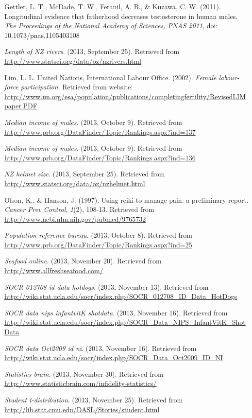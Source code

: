 \documentclass[]{book}
\begin{document}
Gettler, L. T., McDade, T. W., Feranil, A. B., \& Kuzawa, C. W. (2011).
Longitudinal evidence that fatherhood decreases testosterone in human
males. \emph{The Proceedings of the National Academy of Sciences, PNAS 2011},
doi: 10.1073/pnas.1105403108

\emph{Length of NZ rivers}. (2013, September 25). Retrieved from
\url{http://www.statsci.org/data/oz/nzrivers.html}

Lim, L. L. United Nations, International Labour Office. (2002). \emph{Female
labour-force participation}. Retrieved from website:
\url{http://www.un.org/esa/population/publications/completingfertility/RevisedLIMpaper.PDF}

\emph{Median income of males}. (2013, October 9). Retrieved from
\url{http://www.prb.org/DataFinder/Topic/Rankings.aspx?ind=137}

\emph{Median income of males}. (2013, October 9). Retrieved from
\url{http://www.prb.org/DataFinder/Topic/Rankings.aspx?ind=136}

\emph{NZ helmet size}. (2013, September 25). Retrieved from
\url{http://www.statsci.org/data/oz/nzhelmet.html}

Olson, K., \& Hanson, J. (1997). Using reiki to manage pain: a
preliminary report. \emph{Cancer Prev Control}, \emph{1}(2), 108-13. Retrieved
from \url{http://www.ncbi.nlm.nih.gov/pubmed/9765732}

\emph{Population reference bureau}. (2013, October 8). Retrieved from
\url{http://www.prb.org/DataFinder/Topic/Rankings.aspx?ind=25}

\emph{Seafood online}. (2013, November 20). Retrieved from
\url{http://www.allfreshseafood.com/}

\emph{SOCR 012708 id data hotdogs}. (2013, November 13). Retrieved from
\url{http://wiki.stat.ucla.edu/socr/index.php/SOCR_012708_ID_Data_HotDogs}

\emph{SOCR data nips infantvitK shotdata}. (2013, November 16). Retrieved
from
\url{http://wiki.stat.ucla.edu/socr/index.php/SOCR_Data_NIPS_InfantVitK_ShotData}

\emph{SOCR data Oct2009 id ni}. (2013, November 16). Retrieved from
\url{http://wiki.stat.ucla.edu/socr/index.php/SOCR_Data_Oct2009_ID_NI}

\emph{Statistics brain}. (2013, November 30). Retrieved from
\url{http://www.statisticbrain.com/infidelity-statistics/}

\emph{Student t-distribution}. (2013, November 25). Retrieved from
\url{http://lib.stat.cmu.edu/DASL/Stories/student.html}
\end{document}
